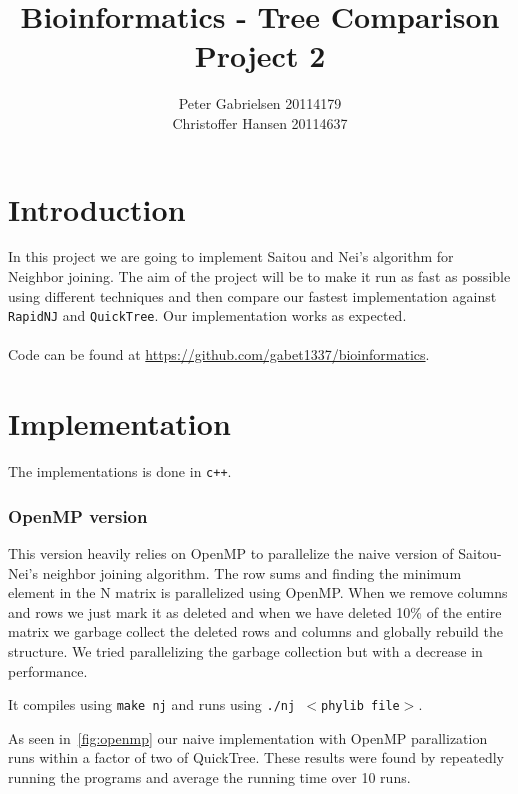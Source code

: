 \documentclass[a4paper,oneside,article,11pt]{memoir}
\title{Bioinformatics - Tree Comparison \\ Project 2}
\author{Peter Gabrielsen 20114179\\
Christoffer Hansen 20114637}
\begin{document}
\maketitle

\chapter*{Introduction}
In this project we are going to implement Saitou and Nei's algorithm for Neighbor joining. The aim of the project will be to make it run as fast as possible using different techniques and then compare our fastest implementation against \texttt{RapidNJ} and \texttt{QuickTree}.
Our implementation works as expected.
\\\\Code can be found at \url{https://github.com/gabet1337/bioinformatics}.

\pagebreak

\chapter*{Implementation}
The implementations is done in \texttt{c++}. 

\subsection*{OpenMP version}
This version heavily relies on OpenMP to parallelize the naive version of Saitou-Nei's neighbor joining algorithm. The row sums and finding the minimum element in the N matrix is parallelized using OpenMP. When we remove columns and rows we just mark it as deleted and when we have deleted 10\% of the entire matrix we garbage collect the deleted rows and columns and globally rebuild the structure. We tried parallelizing the garbage collection but with a decrease in performance.

It compiles using \texttt{make nj} and runs using \texttt{./nj $<$phylib file$>$}.

As seen in~\ref{fig:openmp} our naive implementation with OpenMP parallization runs within a factor of two of QuickTree. These results were found by repeatedly running the programs and average the running time over 10 runs.
\end{document}
